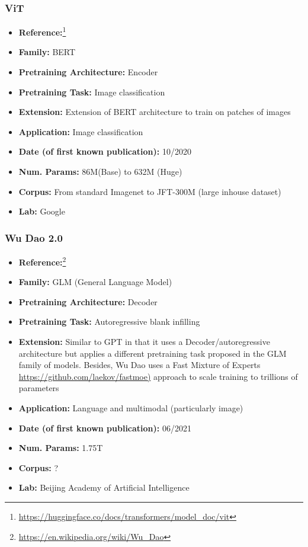 \documentclass{article}
\begin{document}
\subsubsection{ViT}

            \begin{itemize}
                 \item \textbf{Reference:}\footnote{\url{https://huggingface.co/docs/transformers/model_doc/vit}}\cite{dosovitskiy2020image}
                 \item \textbf{Family:} BERT
                \item \textbf{Pretraining Architecture:} Encoder
                \item \textbf{Pretraining Task:} Image classification
                \item \textbf{Extension:} Extension of BERT architecture to train on patches of images
                \item \textbf{Application:} Image classification
                \item \textbf{Date (of first known publication):} 10/2020
                \item \textbf{Num. Params:} 86M(Base) to 632M (Huge)
                \item \textbf{Corpus:} From standard Imagenet to JFT-300M (large inhouse dataset)
                \item \textbf{Lab:} Google
            \end{itemize}

\subsubsection{Wu Dao 2.0}

            \begin{itemize}
                \item \textbf{Reference:}\footnote{\url{https://en.wikipedia.org/wiki/Wu_Dao}}
                \item \textbf{Family:} GLM (General Language Model)
                \item \textbf{Pretraining Architecture:} Decoder
                \item \textbf{Pretraining Task:} Autoregressive blank infilling
                \item \textbf{Extension:} Similar to GPT in that it uses a Decoder/autoregressive architecture but applies a different pretraining task proposed in the GLM family of models. Besides, Wu Dao uses a Fast Mixture of Experts \url{https://github.com/laekov/fastmoe)} approach to scale training to trillions of parameters
                \item \textbf{Application:} Language and multimodal (particularly image)
                \item \textbf{Date (of first known publication):} 06/2021
                \item \textbf{Num. Params:} 1.75T
                \item \textbf{Corpus:} ?
                \item \textbf{Lab:} Beijing Academy of Artificial Intelligence
            \end{itemize}
\end{document}
